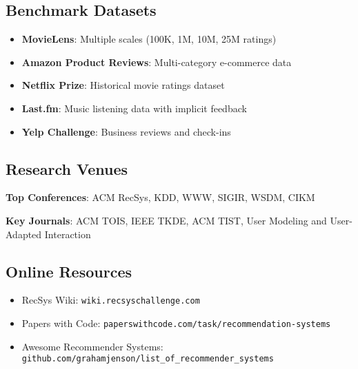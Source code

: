 \subsection{Benchmark Datasets}
\begin{itemize}
    \item \textbf{MovieLens}: Multiple scales (100K, 1M, 10M, 25M ratings)
    \item \textbf{Amazon Product Reviews}: Multi-category e-commerce data
    \item \textbf{Netflix Prize}: Historical movie ratings dataset
    \item \textbf{Last.fm}: Music listening data with implicit feedback
    \item \textbf{Yelp Challenge}: Business reviews and check-ins
\end{itemize}

\subsection{Research Venues}
\textbf{Top Conferences}: ACM RecSys, KDD, WWW, SIGIR, WSDM, CIKM

\textbf{Key Journals}: ACM TOIS, IEEE TKDE, ACM TIST, User Modeling and User-Adapted Interaction

\subsection{Online Resources}
\begin{itemize}
    \item RecSys Wiki: \texttt{wiki.recsyschallenge.com}
    \item Papers with Code: \texttt{paperswithcode.com/task/recommendation-systems}
    \item Awesome Recommender Systems: \texttt{github.com/grahamjenson/list\_of\_recommender\_systems}
\end{itemize}
